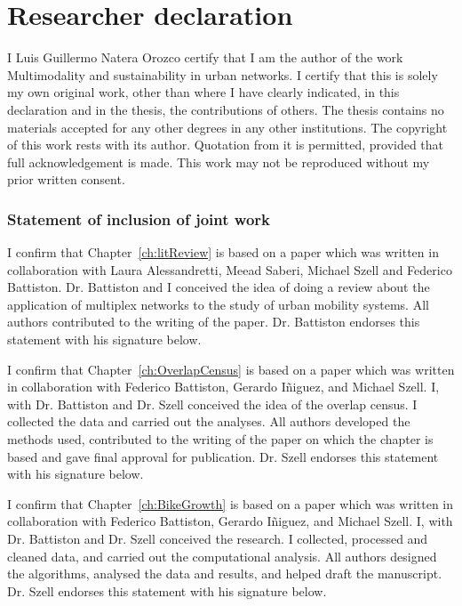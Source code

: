 \documentclass[a4paper,twoside,12pt]{book}
\begin{document}
\mbox{}

\pagestyle{empty}

\newpage


\chapter*{Researcher declaration}
I Luis Guillermo Natera Orozco certify that I am the author of the work Multimodality and sustainability in urban networks. I certify that this is solely my own original work, other than where I have clearly indicated, in this declaration and in the thesis, the contributions of others. The thesis contains no materials accepted for any other degrees in any other institutions.  The copyright of this work rests with its author. Quotation from it is permitted, provided that full acknowledgement is made. This work may not be reproduced without my prior written consent.

\subsection*{Statement of inclusion of joint work}
I confirm that Chapter~\ref{ch:litReview} is based on a paper which was written in collaboration with Laura Alessandretti, Meead Saberi, Michael Szell and Federico Battiston. Dr. Battiston and I conceived the idea of doing a review about the application of multiplex networks to the study of urban mobility systems. All authors contributed to the writing of the paper. Dr. Battiston endorses this statement with his signature below.

\vspace{.2cm}

I confirm that Chapter~\ref{ch:OverlapCensus} is based on a paper which was written in collaboration with Federico Battiston, Gerardo I\~niguez, and Michael Szell. I, with Dr. Battiston and Dr. Szell conceived the idea of the overlap census. I collected the data and carried out the analyses. All authors developed the methods used, contributed to the writing of the paper on which the chapter is based and gave final approval for publication. Dr. Szell endorses this statement with his signature below.

\vspace{.2cm}

I confirm that Chapter~\ref{ch:BikeGrowth} is based on a paper which was written in collaboration with Federico Battiston, Gerardo I\~niguez, and Michael Szell. I, with Dr. Battiston and Dr. Szell conceived the research. I collected, processed and cleaned data, and carried out the computational analysis. All authors designed the algorithms, analysed the data and results, and helped draft the manuscript. Dr. Szell endorses this statement with his signature below.
\end{document}
